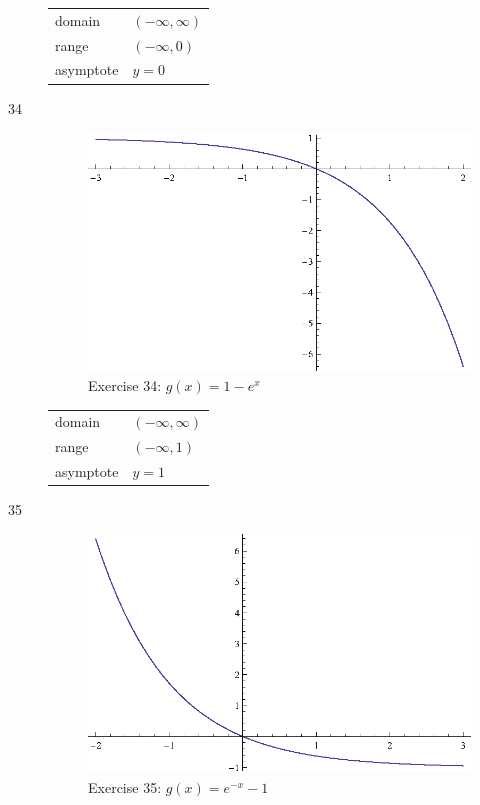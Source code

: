 \documentclass{exam}
\begin{document}
\begin{description}
        \begin{tabular}[H]{ll}
          \toprule
          domain    & $(-\infty, \infty)$ \\
          range     & $(-\infty, 0)$ \\
          asymptote & $y = 0$ \\
          \bottomrule
        \end{tabular}

      \item[34] 
        \begin{figure}[H]
          \centering
          \includegraphics[scale=0.9]{exercise34.eps}
          \caption*{Exercise 34: $g(x) = 1 - e^x$}
        \end{figure}

        \begin{tabular}[H]{ll}
          \toprule
          domain    & $(-\infty, \infty)$ \\
          range     & $(-\infty, 1)$ \\
          asymptote & $y = 1$ \\
          \bottomrule
        \end{tabular}

      \item[35] 
        \begin{figure}[H]
          \centering
          \includegraphics[scale=0.9]{exercise35.eps}
          \caption*{Exercise 35: $g(x) = e^{-x} - 1$}
        \end{figure}


\end{description}
\end{document}
